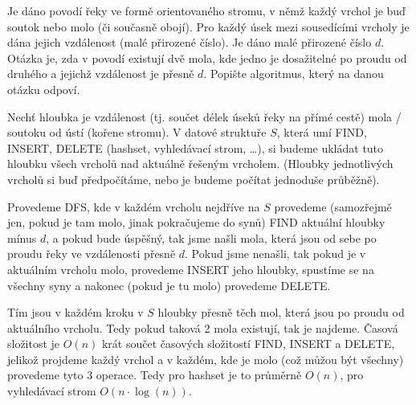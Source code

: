 \documentclass[12pt]{article}                   %
\begin{document}
    \begin{priklad}[řeka]
        Je dáno povodí řeky ve formě orientovaného stromu, v němž každý vrchol je buď soutok nebo molo (či současně obojí). Pro každý úsek mezi sousedícími vrcholy je dána jejich vzdálenost (malé přirozené číslo). Je dáno malé přirozené číslo $d$. Otázka je, zda v povodí existují dvě mola, kde jedno je dosažitelné po proudu od druhého a jejichž vzdálenost je přesně $d$. Popište algoritmus, který na danou otázku odpoví. 

        \begin{reseni}
            Nechť hloubka je vzdálenost (tj. součet délek úseků řeky na přímé cestě) mola / soutoku od ústí (kořene stromu). V datové struktuře $S$, která umí FIND, INSERT, DELETE (hashset, vyhledávací strom, …), si budeme ukládat tuto hloubku všech vrcholů nad aktuálně řešeným vrcholem. (Hloubky jednotlivých vrcholů si buď předpočítáme, nebo je budeme počítat jednoduše průběžně).

            Provedeme DFS, kde v každém vrcholu nejdříve na $S$ provedeme (samozřejmě jen, pokud je tam molo, jinak pokračujeme do synů) FIND aktuální hloubky mínus $d$, a pokud bude úspěšný, tak jsme našli mola, která jsou od sebe po proudu řeky ve vzdálenosti přesně $d$. Pokud jsme nenašli, tak pokud je v aktuálním vrcholu molo, provedeme INSERT jeho hloubky, spustíme se na všechny syny a nakonec (pokud je tu molo) provedeme DELETE.

            Tím jsou v každém kroku v $S$ hloubky přesně těch mol, která jsou po proudu od aktuálního vrcholu. Tedy pokud taková 2 mola existují, tak je najdeme. Časová složitost je $O(n)$ krát součet časových složitostí FIND, INSERT a DELETE, jelikož projdeme každý vrchol a v každém, kde je molo (což můžou být všechny) provedeme tyto 3 operace. Tedy pro hashset je to průměrně $O(n)$, pro vyhledávací strom $O(n·\log(n))$. 
        \end{reseni}
    \end{priklad}
\end{document}

